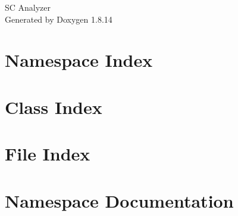 \documentclass[twoside]{book}
\newcommand{\+}{\discretionary{\mbox{\scriptsize$\hookleftarrow$}}{}{}}
\newcommand{\clearemptydoublepage}{%
  \newpage{\pagestyle{empty}\cleardoublepage}%
}
\begin{document}
\hypersetup{pageanchor=false,
             bookmarksnumbered=true,
             pdfencoding=unicode
            }
\begin{titlepage}
\vspace*{7cm}
\begin{center}%
{\Large SC Analyzer }\\
\vspace*{1cm}
{\large Generated by Doxygen 1.8.14}\\
\end{center}
\end{titlepage}
\clearemptydoublepage
{}
\tableofcontents
\clearemptydoublepage
{}
\hypersetup{pageanchor=true}

\chapter{Namespace Index}

\chapter{Class Index}

\chapter{File Index}

\chapter{Namespace Documentation}







\end{document}
